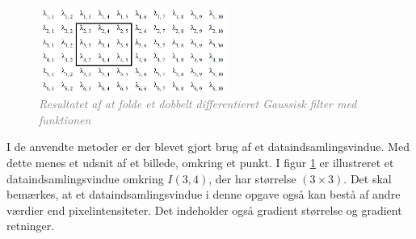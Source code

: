 \begin{figure}[H]
    \centering
    \includegraphics[width=0.55\textwidth]{fig/dataindsamlingsvinduepic.png}
    \vspace{-1em}   
    \begin{center}
    \caption{\textcolor{gray}{\footnotesize \textit{
     Resultatet af at folde et dobbelt differentieret Gaussisk filter med funktionen}}}
    \label{fig:dataindvin}
     \end{center}
    \vspace{-2.5em}  
  \end{figure}
\noindent
I de anvendte metoder er der blevet gjort brug af et dataindsamlingsvindue. Med dette menes et udsnit af et billede, omkring et punkt. I figur \ref{fig:dataindvin} er illustreret et dataindsamlingsvindue omkring $I(3,4)$, der har størrelse $(3 \times 3)$. Det skal bemærkes, at et dataindsamlingsvindue i denne opgave også kan bestå af andre værdier end pixelintensiteter. Det indeholder også gradient størrelse og gradient retninger.